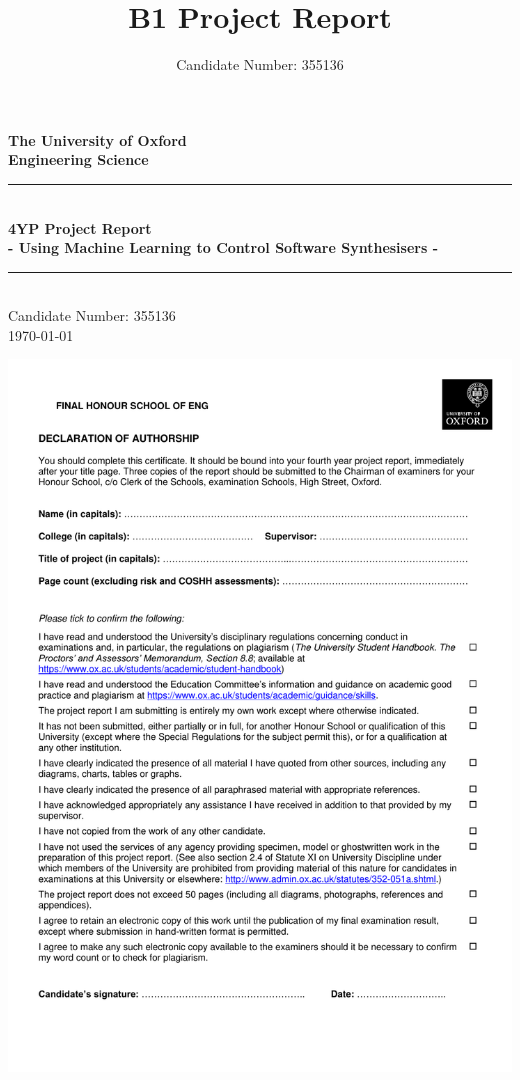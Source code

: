 \documentclass[11pt, oneside]{report}   	%
\title{B1 Project Report}
\author{Candidate Number: 355136}
\date{}							%
\newenvironment{changemargin}[3]{%
\begin{list}{}{%
\setlength{\topsep}{0pt}%
\setlength{\leftmargin}{#1}%
\setlength{\rightmargin}{#2}%
\setlength{\topmargin}{#3}%
\setlength{\listparindent}{\parindent}%
\setlength{\itemindent}{\parindent}%
\setlength{\parsep}{\parskip}%
}%
\item[]}{\end{list}}
\begin{document}
\begin{titlepage}
\begin{center}
\vspace*{1cm}
\Large {\textbf{The University of Oxford}}\\
\Large{\textbf{Engineering Science}}\\
\vfill
\noindent\rule{5in}{0.6pt}\\[1mm]
\huge{\textbf{4YP Project Report}}\\[3mm]
\Large{\textbf{- Using Machine Learning to Control Software Synthesisers  -}}\\[1mm]
\noindent\rule{5in}{0.6pt}\\[1mm]
\vfill
Candidate Number: 355136\\
\today\\
\end{center}
\end{titlepage}

\begin{changemargin}{-1in}{0in}{-1.5in}
\includegraphics{Declaration_of_Authorship_form_2018.pdf}
\thispagestyle{empty}
\end{changemargin}
\end{document}
